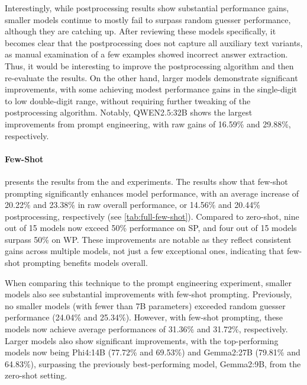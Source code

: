 Interestingly, while postprocessing results show substantial performance gains, smaller models continue to mostly fail to surpass random guesser performance, although they are catching up. After reviewing these models specifically, it becomes clear that the postprocessing does not capture all auxiliary text variants, as manual examination of a few examples showed incorrect answer extraction. Thus, it would be interesting to improve the postprocessing algorithm and then re-evaluate the results. On the other hand, larger models demonstrate significant improvements, with some achieving modest performance gains in the single-digit to low double-digit range, without requiring further tweaking of the postprocessing algorithm. Notably, QWEN2.5:32B shows the largest improvements from prompt engineering, with raw gains of 16.59\% and 29.88\%, respectively.

\paragraph{Few-Shot}
\label{par:few-shot}

 presents the results from the  and  experiments. The results show that few-shot prompting significantly enhances model performance, with an average increase of 20.22\% and 23.38\% in raw overall performance, or 14.56\% and 20.44\% postprocessing, respectively (see \cref{tab:full-few-shot}). Compared to zero-shot, nine out of 15 models now exceed 50\% performance on \ac{SP}, and four out of 15 models surpass 50\% on \ac{WP}. These improvements are notable as they reflect consistent gains across multiple models, not just a few exceptional ones, indicating that few-shot prompting benefits models overall.

When comparing this technique to the prompt engineering experiment, smaller models also see substantial improvements with few-shot prompting. Previously, no smaller models (with fewer than 7B parameters) exceeded random guesser performance (24.04\% and 25.34\%). However, with few-shot prompting, these models now achieve average performances of 31.36\% and 31.72\%, respectively. Larger models also show significant improvements, with the top-performing models now being Phi4:14B (77.72\% and 69.53\%) and Gemma2:27B (79.81\% and 64.83\%), surpassing the previously best-performing model, Gemma2:9B, from the zero-shot setting.

